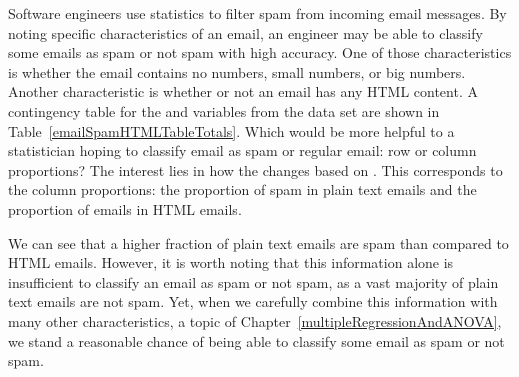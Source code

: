 \begin{example}{Software engineers use statistics to filter spam from incoming email messages. By noting specific characteristics of an email, an engineer may be able to classify some emails as spam or not spam with high accuracy. One of those characteristics is whether the email contains no numbers, small numbers, or big numbers. Another characteristic is whether or not an email has any HTML content. A contingency table for the  and  variables from the  data set are shown in Table~\ref{emailSpamHTMLTableTotals}. Which would be more helpful to a statistician hoping to classify email as spam or regular email: row or column proportions?} \label{weighingRowColumnProportions}
The interest lies in how the  changes based on . This corresponds to the column proportions: the proportion of spam in plain text emails and the proportion of emails in HTML emails.

We can see that a higher fraction of plain text emails are spam than compared to HTML emails. However, it is worth noting that this information alone is insufficient to classify an email as spam or not spam, as a vast majority of plain text emails are not spam. Yet, when we carefully combine this information with many other characteristics, a topic of Chapter~\ref{multipleRegressionAndANOVA}, we stand a reasonable chance of being able to classify some email as spam or not spam. %
\end{example}


